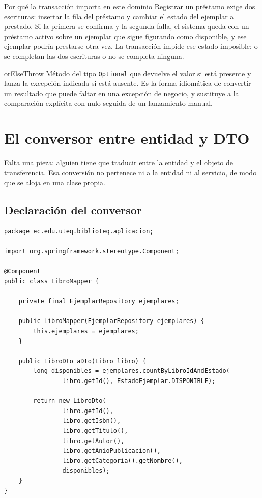 \documentclass[11pt,a4paper,openany]{book}
\begin{document}
\begin{cajaejemplo}{Por qué la transacción importa en este dominio}
	Registrar un préstamo exige dos escrituras: insertar la fila del préstamo y cambiar el estado del ejemplar a prestado. Si la primera se confirma y la segunda falla, el sistema queda con un préstamo activo sobre un ejemplar que sigue figurando como disponible, y ese ejemplar podría prestarse otra vez. La transacción impide ese estado imposible: o se completan las dos escrituras o no se completa ninguna.
\end{cajaejemplo}

\begin{cajadefinicion}{orElseThrow}
	Método del tipo \texttt{Optional} que devuelve el valor si está presente y lanza la excepción indicada si está ausente. Es la forma idiomática de convertir un resultado que puede faltar en una excepción de negocio, y sustituye a la comparación explícita con nulo seguida de un lanzamiento manual.
\end{cajadefinicion}

\section{El conversor entre entidad y DTO}
\label{sec:mapper}

Falta una pieza: alguien tiene que traducir entre la entidad y el objeto de transferencia. Esa conversión no pertenece ni a la entidad ni al servicio, de modo que se aloja en una clase propia.

\subsection{Declaración del conversor}
\label{sec:decl-mapper}

\begin{lstlisting}[style=java,caption={Componente que traduce entre la entidad y su objeto de transferencia.},label={lst:mapper}]
package ec.edu.uteq.biblioteq.aplicacion;

import org.springframework.stereotype.Component;

@Component
public class LibroMapper {

	private final EjemplarRepository ejemplares;

	public LibroMapper(EjemplarRepository ejemplares) {
		this.ejemplares = ejemplares;
	}

	public LibroDto aDto(Libro libro) {
		long disponibles = ejemplares.countByLibroIdAndEstado(
				libro.getId(), EstadoEjemplar.DISPONIBLE);

		return new LibroDto(
				libro.getId(),
				libro.getIsbn(),
				libro.getTitulo(),
				libro.getAutor(),
				libro.getAnioPublicacion(),
				libro.getCategoria().getNombre(),
				disponibles);
	}
}
\end{lstlisting}
\end{document}
